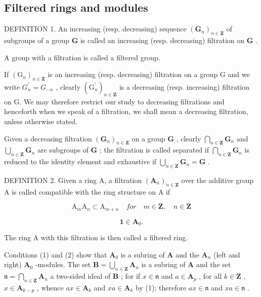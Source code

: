 \subsection{Filtered rings and modules}

DEFINITION 1. An increasing (resp. decreasing) sequence \((\mathbf{G}_n)_{n\in \mathbf{Z}}\) of subgroups of a group \(\mathbf{G}\) is called an increasing (resp. decreasing) filtration on \(\mathbf{G}\) .

A group with a filtration is called a filtered group.

If \((\mathrm{G}_{n})_{n\in\mathbf{Z}}\) is an increasing (resp. decreasing) filtration on a group G and we write \(G_{n}^{\prime}=G_{-n}\) , clearly \((\mathrm{G}_{n}^{\prime})_{n\in\mathbf{Z}}\) is a decreasing (resp. increasing) filtration on G. We may therefore restrict our study to decreasing filtrations and henceforth when we speak of a filtration, we shall mean a decreasing filtration, unless otherwise stated.

Given a decreasing filtration \((\mathbf{G}_n)_{n\in \mathbf{Z}}\) on a group \(\mathbf{G}\) , clearly \(\bigcap_{n\in \mathbf{Z}}\mathbf{G}_n\) and \(\bigcup_{n\in \mathbf{Z}}\mathbf{G}_n\) are subgroups of \(\mathbf{G}\) ; the filtration is called separated if \(\bigcap_{n\in \mathbf{Z}}\mathbf{G}_n\) is reduced to the identity element and exhaustive if \(\bigcup_{n\in \mathbf{Z}}\mathbf{G}_n = \mathbf{G}\) .

DEFINITION 2. Given a ring A, a filtration \((\mathbf{A}_n)_{n\in \mathbf{Z}}\) over the additive group A is called compatible with the ring structure on A if

\[
\mathrm{A} _ {m} \mathrm{A} _ {n} \subset \mathrm{A} _ {m + n} \quad for \quad m \in \mathbf {Z}, \quad n \in \mathbf {Z}\tag{1}
\]

\[
\mathbf {1} \in \mathbf {A} _ {0}.\tag{2}
\]

The ring A with this filtration is then called a filtered ring.

Conditions (1) and (2) show that \(\mathbf{A}_0\) is a subring of \(\mathbf{A}\) and the \(\mathbf{A}_n\) (left and right) \(\mathbf{A}_0\) -modules. The set \(\mathbf{B} = \bigcup_{n \in \mathbf{Z}} \mathbf{A}_n\) is a subring of \(\mathbf{A}\) and the set \(\mathfrak{n} = \bigcap_{n \in \mathbf{Z}} \mathbf{A}_n\) a two-sided ideal of \(\mathbf{B}\) ; for if \(x \in \mathfrak{n}\) and \(a \in \mathbf{A}_p\) , for all \(k \in \mathbf{Z}\) , \(x \in \mathbf{A}_{k-p}\) , whence \(ax \in \mathbf{A}_k\) and \(xa \in \mathbf{A}_k\) by (1); therefore \(ax \in \mathfrak{n}\) and \(xa \in \mathfrak{n}\) .

